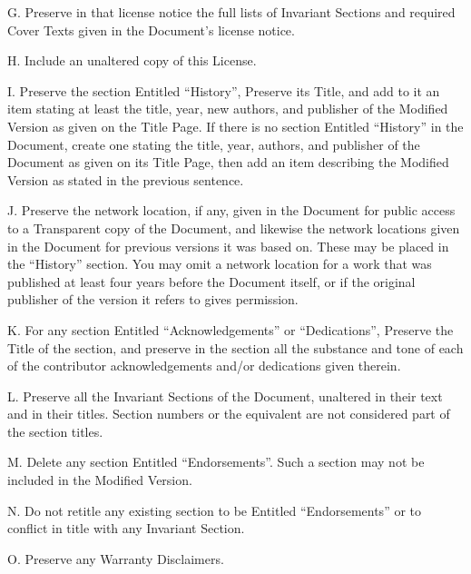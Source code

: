{\tiny{}G. Preserve in that license notice the full lists of Invariant
Sections and required Cover Texts given in the Document's license
notice.}{\tiny\par}

{\tiny{}H. Include an unaltered copy of this License.}{\tiny\par}

{\tiny{}I. Preserve the section Entitled ``History'', Preserve its
Title, and add to it an item stating at least the title, year, new
authors, and publisher of the Modified Version as given on the Title
Page. If there is no section Entitled \textquotedblleft History\textquotedblright{}
in the Document, create one stating the title, year, authors, and
publisher of the Document as given on its Title Page, then add an
item describing the Modified Version as stated in the previous sentence.}{\tiny\par}

{\tiny{}J. Preserve the network location, if any, given in the Document
for public access to a Transparent copy of the Document, and likewise
the network locations given in the Document for previous versions
it was based on. These may be placed in the ``History'' section.
You may omit a network location for a work that was published at least
four years before the Document itself, or if the original publisher
of the version it refers to gives permission.}{\tiny\par}

{\tiny{}K. For any section Entitled ``Acknowledgements'' or ``Dedications'',
Preserve the Title of the section, and preserve in the section all
the substance and tone of each of the contributor acknowledgements
and/or dedications given therein.}{\tiny\par}

{\tiny{}L. Preserve all the Invariant Sections of the Document, unaltered
in their text and in their titles. Section numbers or the equivalent
are not considered part of the section titles.}{\tiny\par}

{\tiny{}M. Delete any section Entitled ``Endorsements''. Such a
section may not be included in the Modified Version.}{\tiny\par}

{\tiny{}N. Do not retitle any existing section to be Entitled ``Endorsements''
or to conflict in title with any Invariant Section.}{\tiny\par}

{\tiny{}O. Preserve any Warranty Disclaimers.}{\tiny\par}

